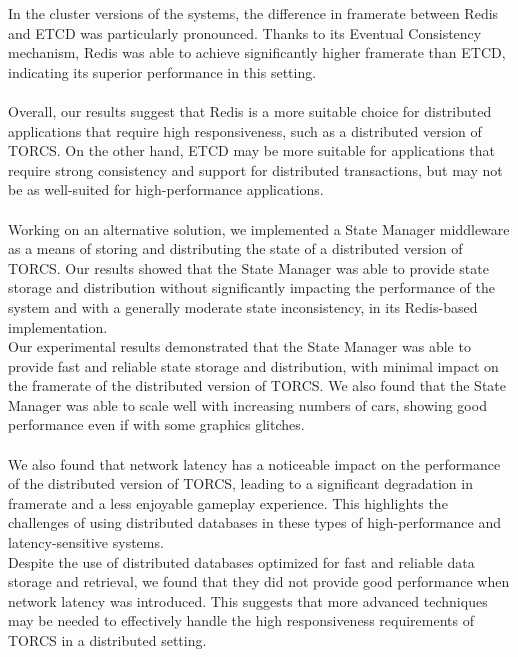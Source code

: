 In the cluster versions of the systems, the difference in framerate between Redis and ETCD was particularly pronounced. Thanks to its Eventual Consistency mechanism, Redis was able to achieve significantly higher framerate than ETCD, indicating its superior performance in this setting. \\ \\
Overall, our results suggest that Redis is a more suitable choice for distributed applications that require high responsiveness, such as a distributed version of TORCS. On the other hand, ETCD may be more suitable for applications that require strong consistency and support for distributed transactions, but may not be as well-suited for high-performance applications. \\ \\
Working on an alternative solution, we implemented a State Manager middleware as a means of storing and distributing the state of a distributed version of TORCS. Our results showed that the State Manager was able to provide state storage and distribution without significantly impacting the performance of the system and with a generally moderate state inconsistency, in its Redis-based implementation. \\
Our experimental results demonstrated that the State Manager was able to provide fast and reliable state storage and distribution, with minimal impact on the framerate of the distributed version of TORCS. We also found that the State Manager was able to scale well with increasing numbers of cars, showing good performance even if with some graphics glitches. \\ \\
We also found that network latency has a noticeable impact on the performance of the distributed version of TORCS, leading to a significant degradation in framerate and a less enjoyable gameplay experience. This highlights the challenges of using distributed databases in these types of high-performance and latency-sensitive systems. \\
Despite the use of distributed databases optimized for fast and reliable data storage and retrieval, we found that they did not provide good performance when network latency was introduced. This suggests that more advanced techniques may be needed to effectively handle the high responsiveness requirements of TORCS in a distributed setting.

